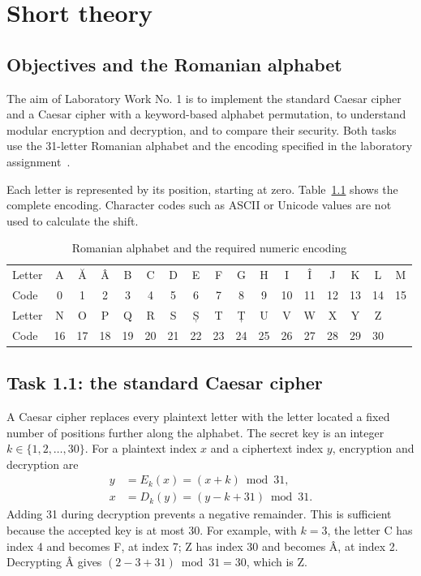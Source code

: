 \documentclass{tum_report}
\begin{document}

\clearpage
{}
\tableofcontents
\thispagestyle{empty}
\clearpage
\pagestyle{fancy}

\chapter{Short theory}
\section{Objectives and the Romanian alphabet}
The aim of Laboratory Work No. 1 is to implement the standard Caesar cipher
and a Caesar cipher with a keyword-based alphabet permutation, to understand
modular encryption and decryption, and to compare their security. Both tasks
use the 31-letter Romanian alphabet and the encoding specified in the
laboratory assignment~\cite{ref:assignment}.

Each letter is represented by its position, starting at zero. Table~\ref{tab:alphabet}
shows the complete encoding. Character codes such as ASCII or Unicode values
are not used to calculate the shift.
\begin{table}[H]
\caption{Romanian alphabet and the required numeric encoding}
\label{tab:alphabet}
\centering\small
\setlength{\tabcolsep}{5pt}
\begin{tabular}{l*{16}{c}}\toprule
Letter & A & Ă & Â & B & C & D & E & F & G & H & I & Î & J & K & L & M\\
Code & 0 & 1 & 2 & 3 & 4 & 5 & 6 & 7 & 8 & 9 & 10 & 11 & 12 & 13 & 14 & 15\\\midrule
Letter & N & O & P & Q & R & S & Ș & T & Ț & U & V & W & X & Y & Z & \\
Code & 16 & 17 & 18 & 19 & 20 & 21 & 22 & 23 & 24 & 25 & 26 & 27 & 28 & 29 & 30 & \\\bottomrule
\end{tabular}
\end{table}

\section{Task 1.1: the standard Caesar cipher}
A Caesar cipher replaces every plaintext letter with the letter located a
fixed number of positions further along the alphabet. The secret key is an
integer $k\in\{1,2,\ldots,30\}$. For a plaintext index $x$ and a ciphertext
index $y$, encryption and decryption are
\begin{align}
 y &= E_k(x)=(x+k)\bmod 31,\\
 x &= D_k(y)=(y-k+31)\bmod 31.
\end{align}
Adding 31 during decryption prevents a negative remainder. This is sufficient
because the accepted key is at most 30. For example, with $k=3$, the letter
C has index 4 and becomes F, at index 7; Z has index 30 and becomes Â,
at index 2. Decrypting Â gives $(2-3+31)\bmod31=30$, which is Z.
\end{document}
